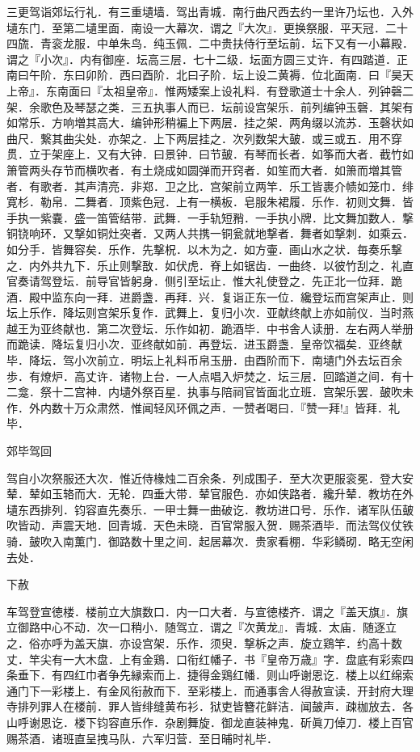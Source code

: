 \documentclass[]{article}
\begin{document}
三更驾诣郊坛行礼．有三重壝墙．驾出青城．南行曲尺西去约一里许乃坛也．入外壝东门．至第二壝里面．南设一大幕次．谓之『大次』．更换祭服．平天冠．二十四旒．青衮龙服．中单朱鸟．纯玉佩．二中贵扶侍行至坛前．坛下又有一小幕殿．谓之『小次』．内有御座．坛高三层．七十二级．坛面方圆三丈许．有四踏道．正南曰午阶．东曰卯阶．西曰酉阶．北曰子阶．坛上设二黄褥．位北面南．曰『昊天上帝』．东南面曰『太祖皇帝』．惟两矮案上设礼料．有登歌道士十余人．列钟磬二架．余歌色及琴瑟之类．三五执事人而已．坛前设宫架乐．前列编钟玉磬．其架有如常乐．方响増其高大．编钟形稍褊上下两层．挂之架．两角缀以流苏．玉磬状如曲尺．繋其曲尖处．亦架之．上下两层挂之．次列数架大皷．或三或五．用不穿贯．立于架座上．又有大钟．曰景钟．曰节皷．有琴而长者．如筝而大者．截竹如箫管两头存节而横吹者．有土烧成如圆弹而开窍者．如笙而大者．如箫而増其管者．有歌者．其声清亮．非郑．卫之比．宫架前立两竿．乐工皆裹介帻如笼巾．绯寛杉．勒帛．二舞者．顶紫色冠．上有一横板．皂服朱裙履．乐作．初则文舞．皆手执一紫嚢．盛一笛管结带．武舞．一手轨短矟．一手执小牌．比文舞加数人．撃铜铙响环．又撃如铜灶突者．又两人共携一铜瓮就地撃者．舞者如撃刺．如乘云．如分手．皆舞容矣．乐作．先撃柷．以木为之．如方壷．画山水之状．毎奏乐撃之．内外共九下．乐止则撃敔．如伏虎．脊上如锯齿．一曲终．以彼竹刮之．礼直官奏请驾登坛．前导官皆躬身．侧引至坛止．惟大礼使登之．先正北一位拜．跪酒．殿中监东向一拜．进爵盏．再拜．兴．复诣正东一位．纔登坛而宫架声止．则坛上乐作．降坛则宫架乐复作．武舞上．复归小次．亚献终献上亦如前仪．当时燕越王为亚终献也．第二次登坛．乐作如初．跪酒毕．中书舎人读册．左右两人举册而跪读．降坛复归小次．亚终献如前．再登坛．进玉爵盏．皇帝饮福矣．亚终献毕．降坛．驾小次前立．明坛上礼料币帛玉册．由酉阶而下．南壝门外去坛百余歩．有燎炉．高丈许．诸物上台．一人点唱入炉焚之．坛三层．回踏道之间．有十二龛．祭十二宫神．内壝外祭百星．执事与陪祠官皆面北立班．宫架乐罢．皷吹未作．外内数十万众肃然．惟闻轻风环佩之声．一赞者喝曰．『赞一拜!』皆拜．礼毕．

郊毕驾回

驾自小次祭服还大次．惟近侍椽烛二百余条．列成围子．至大次更服衮冕．登大安辇．辇如玉辂而大．无轮．四垂大带．辇官服色．亦如侠路者．纔升辇．教坊在外壝东西排列．钧容直先奏乐．一甲士舞一曲破讫．教坊进口号．乐作．诸军队伍皷吹皆动．声震天地．回青城．天色未晓．百官常服入贺．赐茶酒毕．而法驾仪仗铁骑．皷吹入南薫门．御路数十里之间．起居幕次．贵家看棚．华彩鳞砌．略无空闲去处．

下赦

车驾登宣徳楼．楼前立大旗数口．内一口大者．与宣徳楼齐．谓之『盖天旗』．旗立御路中心不动．次一口稍小．随驾立．谓之『次黄龙』．青城．太庙．随逐立之．俗亦呼为盖天旗．亦设宫架．乐作．须臾．撃柝之声．旋立鶏竿．约高十数丈．竿尖有一大木盘．上有金鶏．口衔红幡子．书『皇帝万歳』字．盘底有彩索四条垂下．有四红巾者争先縁索而上．捷得金鶏红幡．则山呼谢恩讫．楼上以红绵索通门下一彩楼上．有金风衔赦而下．至彩楼上．而通事舎人得赦宣读．开封府大理寺排列罪人在楼前．罪人皆绯缝黄布衫．狱吏皆簪花鲜洁．闻皷声．疎枷放去．各山呼谢恩讫．楼下钧容直乐作．杂剧舞旋．御龙直装神鬼．斫眞刀倬刀．楼上百官赐茶酒．诸班直呈拽马队．六军归营．至日晡时礼毕．
\end{document}
